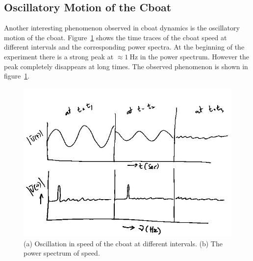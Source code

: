 \documentclass[aps,twocolumn, floatfix, superscriptaddress]{revtex4}
\begin{document}
\subsection{Oscillatory Motion of the Cboat}
\label{sec:movingcboat}
Another interesting phenomenon observed in cboat dynamics is the oscillatory motion of the cboat. Figure~\ref{fig:absvnosds} shows the time traces of the cboat speed at different intervals and the corresponding power spectra. At the beginning of the experiment there is a strong peak at $\approx 1\ \mathrm{Hz}$ in the power spectrum. However the peak completely disappears at long times. The observed phenomenon is shown in figure~\ref{fig:absvnosds}.   
\begin{figure}[ht]
    \begin{center}
       \includegraphics[scale=0.35]{figure5.jpg}
    \end{center}
    \caption{(a) Oscillation in speed of the cboat at different intervals. (b) The power spectrum of speed.}
    \label{fig:absvnosds}
\end{figure}
\end{document}
